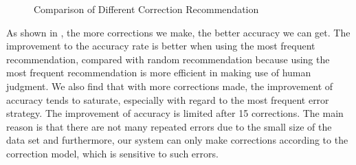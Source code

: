\begin{figure*}[ht]
\centering
{}
{}
\hfill
{}
{}
\caption{Comparison of Different Correction Recommendation}
\label{fig:humancorr}
\end{figure*}


As shown in , the more corrections we make, the better accuracy 
we can get. 
The improvement to the accuracy rate is better 
when using the most frequent recommendation, compared with random 
recommendation because using the most 
frequent recommendation is more efficient in making use of human judgment. 
We also find that with more corrections made, the improvement of 
accuracy tends to saturate, especially with regard to the most frequent error strategy. 
The improvement of accuracy is limited after 15 corrections. 
The main reason is that there are not many repeated errors due to 
the small size of the data set and furthermore, our system can only make corrections 
according to the correction model, which is sensitive to such errors.




